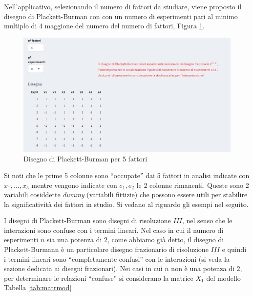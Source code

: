 \documentclass[
  11pt,
]{book}
\begin{document}
Nell'applicativo, selezionando il numero di fattori da studiare, viene proposto il disegno di Plackett-Burman con con un numero di esperimenti pari al minimo multiplo di 4 maggione del numero del numero di fattori, Figura \ref{fig:pb1}.

\begin{figure}[ht]

{\centering \includegraphics[width=1\linewidth]{Immagini/PB/01_dis} 

}

\caption{Disegno di Plackett-Burman per 5 fattori}\label{fig:pb1}
\end{figure}

Si noti che le prime 5 colonne sono ``occupate'' dai 5 fattori in analisi indicate con \(x_1, \dots,x_5\) mentre vengono indicate con \(e_1,e_2\) le 2 colonne rimanenti. Queste sono 2 variabili cosiddette \emph{dummy} (variabili fittizie) che possono essere utili per stabilire la significatività dei fattori in studio. Si vedano al riguardo gli esempi nel seguito.

I disegni di Plackett-Burman sono disegni di risoluzione \(III\), nel senso che le interazioni sono confuse con i termini lineari. Nel caso in cui il numero di esperimenti \(n\) sia una potenza di \(2\), come abbiamo già detto, il disegno di Plackett-Burmann è un particolare disegno frazionario di risoluzione \(III\) e quindi i termini lineari sono ``completamente confusi'' con le interazioni (si veda la sezione dedicata ai disegni frazionari). Nei casi in cui \(n\) non è una potenza di \(2\), per determinare le relazioni ``confuse'' si considerano la matrice \(X_1\) del modello Tabella \ref{tab:matrmod}\newpage
\end{document}
